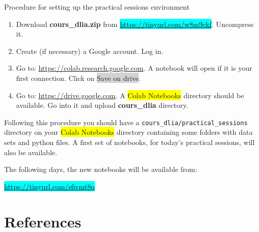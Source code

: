 \documentclass[xcolor=pdftex,dvipsnames,table,mathserif]{beamer}
\begin{document}
\begin{frame}{Procedure for setting up the practical sessions environment}

  \scriptsize

  \begin{enumerate}
  \item Download \textbf{cours\_dlia.zip} from \colorbox{cyan}{\url{https://tinyurl.com/w8m9ckf}}. Uncompress it.
  \item Create (if necessary) a Google account. Log in.
  \item Go to: \url{https://colab.research.google.com}. A notebook will open if it is your first connection. Click on \colorbox{lightgray}{Save on drive}.
  \item Go to: \url{https://drive.google.com}. A \colorbox{yellow}{Colab Notebooks} directory should be available. Go into it and upload \textbf{cours\_dlia} directory.
  \end{enumerate}

  Following this procedure you should have a \texttt{cours\_dlia/practical\_sessions} directory on your \colorbox{yellow}{Colab Notebooks} directory containing some folders with data sets and python files. A first set of notebooks, for today's practical sessions, will also be available.

  The following days, the new notebooks will be available from:

  \centering

  \colorbox{cyan}{\url{https://tinyurl.com/s6vmt8q}}


\end{frame}



\section*{References}



\end{document}
